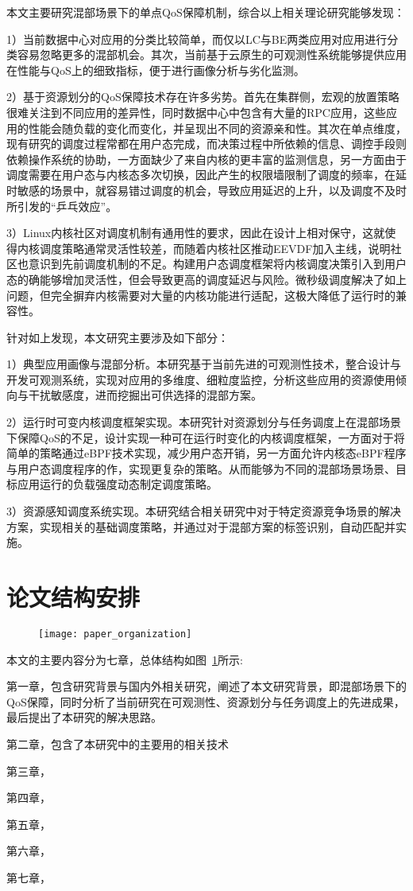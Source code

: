 本文主要研究混部场景下的单点QoS保障机制，综合以上相关理论研究能够发现：

1）当前数据中心对应用的分类比较简单，而仅以LC与BE两类应用对应用进行分类容易忽略更多的混部机会。其次，当前基于云原生的可观测性系统能够提供应用在性能与QoS上的细致指标，便于进行画像分析与劣化监测。

2）基于资源划分的QoS保障技术存在许多劣势。首先在集群侧，宏观的放置策略很难关注到不同应用的差异性，同时数据中心中包含有大量的RPC应用，这些应用的性能会随负载的变化而变化，并呈现出不同的资源亲和性。其次在单点维度，现有研究的调度过程常都在用户态完成，而决策过程中所依赖的信息、调控手段则依赖操作系统的协助，一方面缺少了来自内核的更丰富的监测信息，另一方面由于调度需要在用户态与内核态多次切换，因此产生的权限墙限制了调度的频率，在延时敏感的场景中，就容易错过调度的机会，导致应用延迟的上升，以及调度不及时所引发的“乒乓效应”。

3）Linux内核社区对调度机制有通用性的要求，因此在设计上相对保守，这就使得内核调度策略通常灵活性较差，而随着内核社区推动EEVDF加入主线，说明社区也意识到先前调度机制的不足。构建用户态调度框架将内核调度决策引入到用户态的确能够增加灵活性，但会导致更高的调度延迟与风险。微秒级调度解决了如上问题，但完全摒弃内核需要对大量的内核功能进行适配，这极大降低了运行时的兼容性。

针对如上发现，本文研究主要涉及如下部分：

1）典型应用画像与混部分析。本研究基于当前先进的可观测性技术，整合设计与开发可观测系统，实现对应用的多维度、细粒度监控，分析这些应用的资源使用倾向与干扰敏感度，进而挖掘出可供选择的混部方案。

2）运行时可变内核调度框架实现。本研究针对资源划分与任务调度上在混部场景下保障QoS的不足，设计实现一种可在运行时变化的内核调度框架，一方面对于将简单的策略通过eBPF技术实现，减少用户态开销，另一方面允许内核态eBPF程序与用户态调度程序的作，实现更复杂的策略。从而能够为不同的混部场景场景、目标应用运行的负载强度动态制定调度策略。

3）资源感知调度系统实现。本研究结合相关研究中对于特定资源竞争场景的解决方案，实现相关的基础调度策略，并通过对于混部方案的标签识别，自动匹配并实施。

\section{论文结构安排}

\begin{figure}[!htbp]
    \centering
    \texttt{[image: paper\_organization]}
    \label{fig:paper_organization}
\end{figure}

本文的主要内容分为七章，总体结构如图~\ref{fig:paper_organization}所示:

第一章，包含研究背景与国内外相关研究，阐述了本文研究背景，即混部场景下的QoS保障，同时分析了当前研究在可观测性、资源划分与任务调度上的先进成果，最后提出了本研究的解决思路。

第二章，包含了本研究中的主要用的相关技术

第三章，

第四章，

第五章，

第六章，

第七章，